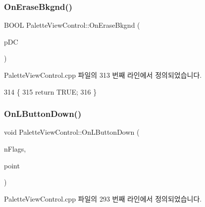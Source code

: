 \subsubsection{\texorpdfstring{On\+Erase\+Bkgnd()}{OnEraseBkgnd()}}
{\footnotesize\ttfamily B\+O\+OL Palette\+View\+Control\+::\+On\+Erase\+Bkgnd (\begin{DoxyParamCaption}\item[{C\+DC $\ast$}]{p\+DC }\end{DoxyParamCaption})\hspace{0.3cm}{\ttfamily [protected]}}



Palette\+View\+Control.\+cpp 파일의 313 번째 라인에서 정의되었습니다.


\begin{DoxyCode}
314 \{
315   \textcolor{keywordflow}{return} TRUE;
316 \}
\end{DoxyCode}
\mbox{\label{class_palette_view_control_a766a44e9b018fc6c87f81f3c0fdd6c6e}} 
\subsubsection{\texorpdfstring{On\+L\+Button\+Down()}{OnLButtonDown()}}
{\footnotesize\ttfamily void Palette\+View\+Control\+::\+On\+L\+Button\+Down (\begin{DoxyParamCaption}\item[{U\+I\+NT}]{n\+Flags,  }\item[{C\+Point}]{point }\end{DoxyParamCaption})\hspace{0.3cm}{\ttfamily [protected]}}



Palette\+View\+Control.\+cpp 파일의 293 번째 라인에서 정의되었습니다.


